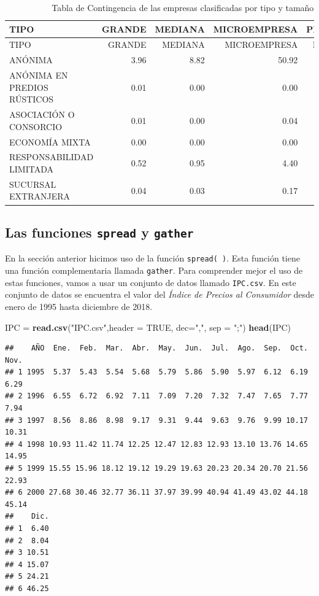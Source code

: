 \documentclass[letterpaper,]{book}
\newenvironment{Shaded}{\begin{snugshade}}{\end{snugshade}}
\newcommand{\DataTypeTok}[1]{\textcolor[rgb]{0.13,0.29,0.53}{#1}}
\newcommand{\KeywordTok}[1]{\textcolor[rgb]{0.13,0.29,0.53}{\textbf{#1}}}
\newcommand{\NormalTok}[1]{#1}
\newcommand{\OtherTok}[1]{\textcolor[rgb]{0.56,0.35,0.01}{#1}}
\newcommand{\StringTok}[1]{\textcolor[rgb]{0.31,0.60,0.02}{#1}}
\begin{document}
\begin{longtable}[]{@{}lrrrr@{}}
\caption{\label{tab:contpeqporc}Tabla de Contingencia de las empresas clasificadas por tipo y tamaño}\tabularnewline
\toprule
TIPO & GRANDE & MEDIANA & MICROEMPRESA & PEQUEÑA\tabularnewline
\midrule
\endfirsthead
\toprule
TIPO & GRANDE & MEDIANA & MICROEMPRESA & PEQUEÑA\tabularnewline
\midrule
\endhead
ANÓNIMA & 3.96 & 8.82 & 50.92 & 27.42\tabularnewline
ANÓNIMA EN PREDIOS RÚSTICOS & 0.01 & 0.00 & 0.00 & 0.03\tabularnewline
ASOCIACIÓN O CONSORCIO & 0.01 & 0.00 & 0.04 & 0.02\tabularnewline
ECONOMÍA MIXTA & 0.00 & 0.00 & 0.00 & 0.00\tabularnewline
RESPONSABILIDAD LIMITADA & 0.52 & 0.95 & 4.40 & 2.60\tabularnewline
SUCURSAL EXTRANJERA & 0.04 & 0.03 & 0.17 & 0.04\tabularnewline
\bottomrule
\end{longtable}

\newpage

\hypertarget{las-funciones-spread-y-gather}{%
\subsection{\texorpdfstring{Las funciones \texttt{spread} y \texttt{gather}}{Las funciones spread y gather}}\label{las-funciones-spread-y-gather}}

En la sección anterior hicimos uso de la función \texttt{spread(\ )}. Esta función tiene una función complementaria llamada \texttt{gather}. Para comprender mejor el uso de estas funciones, vamos a usar un conjunto de datos llamado \texttt{IPC.csv}. En este conjunto de datos se encuentra el valor del \emph{Índice de Precios al Consumidor} desde enero de 1995 hasta diciembre de 2018.

\begin{Shaded}
\begin{Highlighting}[]
\NormalTok{IPC =}\StringTok{ }\KeywordTok{read.csv}\NormalTok{(}\StringTok{"IPC.csv"}\NormalTok{,}\DataTypeTok{header =} \OtherTok{TRUE}\NormalTok{, }\DataTypeTok{dec=}\StringTok{","}\NormalTok{, }\DataTypeTok{sep =} \StringTok{";"}\NormalTok{)}
\KeywordTok{head}\NormalTok{(IPC)}
\end{Highlighting}
\end{Shaded}

\begin{verbatim}
##    AÑO  Ene.  Feb.  Mar.  Abr.  May.  Jun.  Jul.  Ago.  Sep.  Oct.  Nov.
## 1 1995  5.37  5.43  5.54  5.68  5.79  5.86  5.90  5.97  6.12  6.19  6.29
## 2 1996  6.55  6.72  6.92  7.11  7.09  7.20  7.32  7.47  7.65  7.77  7.94
## 3 1997  8.56  8.86  8.98  9.17  9.31  9.44  9.63  9.76  9.99 10.17 10.31
## 4 1998 10.93 11.42 11.74 12.25 12.47 12.83 12.93 13.10 13.76 14.65 14.95
## 5 1999 15.55 15.96 18.12 19.12 19.29 19.63 20.23 20.34 20.70 21.56 22.93
## 6 2000 27.68 30.46 32.77 36.11 37.97 39.99 40.94 41.49 43.02 44.18 45.14
##    Dic.
## 1  6.40
## 2  8.04
## 3 10.51
## 4 15.07
## 5 24.21
## 6 46.25
\end{verbatim}
\end{document}
